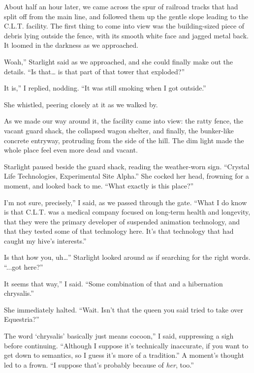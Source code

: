 About half an hour later, we came across the spur of railroad tracks that had split off from the main line, and followed them up the gentle slope leading to the C.L.T. facility. The first thing to come into view was the building-sized piece of debris lying outside the fence, with its smooth white face and jagged metal back. It loomed in the darkness as we approached.

\leavevmode{}Woah,” Starlight said as we approached, and she could finally make out the details. “Is that… is that part of that tower that exploded?”

\leavevmode{}It is,” I replied, nodding. “It was still smoking when I got outside.”

She whistled, peering closely at it as we walked by.

As we made our way around it, the facility came into view: the ratty fence, the vacant guard shack, the collapsed wagon shelter, and finally, the bunker-like concrete entryway, protruding from the side of the hill. The dim light made the whole place feel even more dead and vacant.

Starlight paused beside the guard shack, reading the weather-worn sign. “Crystal Life Technologies, Experimental Site Alpha.” She cocked her head, frowning for a moment, and looked back to me. “What exactly is this place?”

\leavevmode{}I’m not sure, precisely,” I said, as we passed through the gate. “What I do know is that C.L.T. was a medical company focused on long-term health and longevity, that they were the primary developer of suspended animation technology, and that they tested some of that technology here. It’s that technology that had caught my hive’s interests.”

\leavevmode{}Is that how you, uh…” Starlight looked around as if searching for the right words. “...got here?”

\leavevmode{}It seems that way,” I said. “Some combination of that and a hibernation chrysalis.”

She immediately halted. “Wait. Isn’t that the queen you said tried to take over Equestria?”

\leavevmode{}The word ‘chrysalis’ basically just means cocoon,” I said, suppressing a sigh before continuing. “Although I suppose it’s technically inaccurate, if you want to get down to semantics, so I guess it’s more of a tradition.” A moment’s thought led to a frown. “I suppose that’s probably because of \textit{her}, too.”

